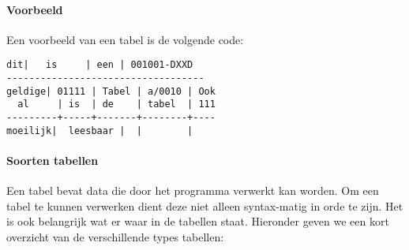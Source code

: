 \paragraph{Voorbeeld}
Een voorbeeld van een tabel is de volgende code:
\begin{verbatim}
dit|   is     | een | 001001-DXXD
-----------------------------------
geldige| 01111 | Tabel | a/0010 | Ook
  al     | is  | de    | tabel  | 111
---------+-----+-------+--------+----
moeilijk|  leesbaar |  |        |
\end{verbatim}
\paragraph{Soorten tabellen}
Een tabel bevat data die door het programma verwerkt kan worden. Om een tabel te kunnen verwerken dient deze niet alleen syntax-matig in orde te zijn. Het is ook belangrijk wat er waar in de tabellen staat. Hieronder geven we een kort overzicht van de verschillende types tabellen:
